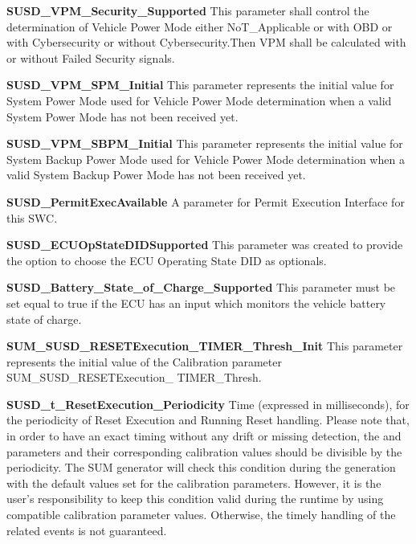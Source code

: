 {\textbf{SUSD\_VPM\_Security\_Supported }\newline
This parameter shall control the determination of Vehicle Power Mode either NoT\_Applicable or with OBD or with Cybersecurity or without Cybersecurity.Then VPM shall be calculated with or without Failed Security signals.

\textbf{SUSD\_VPM\_SPM\_Initial}\newline
This parameter represents the initial value for System Power Mode used for Vehicle Power Mode determination when a valid System Power Mode has not been received yet.

\textbf{SUSD\_VPM\_SBPM\_Initial }\newline
This parameter represents the initial value for System Backup Power Mode used for Vehicle Power Mode determination when a valid System Backup Power Mode has not been received yet.

\textbf{SUSD\_PermitExecAvailable }\newline
A parameter for Permit Execution Interface for this SWC. 

\textbf{SUSD\_ECUOpStateDIDSupported}\newline
This parameter was created to provide the option to choose the ECU Operating State DID as optionals.

\textbf{SUSD\_Battery\_State\_of\_Charge\_Supported}\newline
This parameter must be set equal to true if the ECU has an input which monitors the vehicle battery state of charge.

\textbf{SUM\_SUSD\_RESETExecution\_TIMER\_Thresh\_Init}\newline
This parameter represents the initial value of the Calibration parameter SUM\_SUSD\_RESETExecution\_ TIMER\_Thresh.

\textbf{SUSD\_t\_ResetExecution\_Periodicity}\newline
Time (expressed in milliseconds), for the periodicity of Reset Execution and Running Reset handling. 
Please note that, in order to have an exact timing without any drift or missing detection, the  and  parameters
and their corresponding calibration values should be divisible by the periodicity. 
The SUM generator will check this condition during the generation with the default values set for the calibration parameters. However, it is the user's responsibility to keep this condition valid during the runtime 
by using compatible calibration parameter values. Otherwise, the timely handling of the related events is not guaranteed.

}
